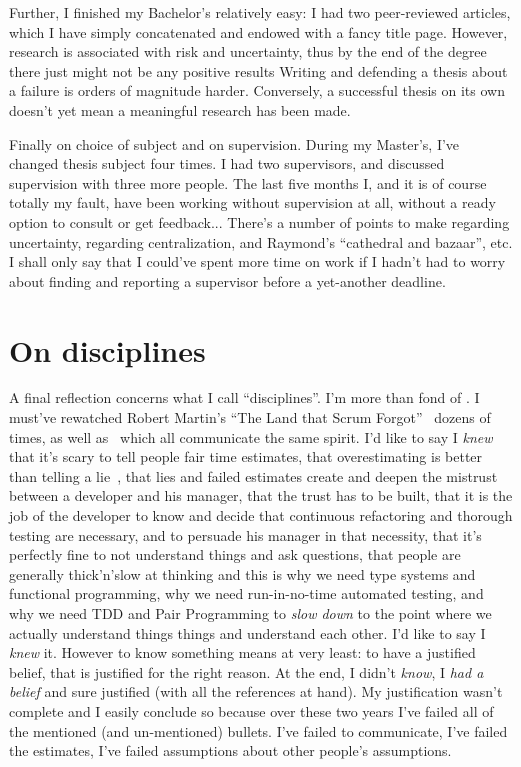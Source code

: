Further, I finished my Bachelor's relatively easy: I had two peer-reviewed
articles, which I have simply concatenated and endowed with a fancy title page.
However, research is associated with risk and uncertainty, thus by the end of
the degree there just might not be any positive results
Writing and defending a thesis about a failure is orders of magnitude harder.
Conversely, a successful thesis on its own doesn't yet mean a meaningful
research has been made.

Finally on choice of subject and on supervision. During my Master's, I've
changed thesis subject four times.  I had two supervisors, and discussed
supervision with three more people. The last five months I, and it is of course
totally my fault, have been working without supervision at all, without a ready
option to consult or get feedback... There's a number of points to make
regarding uncertainty, regarding centralization, and Raymond's ``cathedral and
bazaar'', etc. I shall only say that I could've spent more time on work if I
hadn't had to worry about finding and reporting a supervisor before a
yet-another deadline.

\section*{On disciplines}

A final reflection concerns what I call ``disciplines''.  I'm more than fond of
\citet{c2wiki}. I must've rewatched Robert Martin's ``The Land that Scrum
Forgot''~\cite{unclebobScrum} dozens of times, as well
as~\citet{unclebobProfessionalism,unclebobFuture,unclebobPrinciples,unclebobFunctional,unclebobCoplienTDD,unclebobTDD,unclebobHowNotToLie}
which all communicate the same spirit. I'd like to say I \emph{knew}
that it's scary to tell people fair time estimates,
that overestimating is better than telling a lie~\cite{unclebobHowNotToLie},
that lies and failed estimates create and deepen the mistrust between a
developer and his manager, that the trust has to be built, that it is the job
of the developer to know and decide that continuous refactoring and thorough
testing are necessary, and to persuade his manager in that necessity, that it's
perfectly fine to not understand things and ask questions, that people are generally
thick'n'slow at thinking and this is why we need type systems and functional programming,
why we need run-in-no-time automated testing, and why we need TDD and Pair Programming
to \emph{slow down} to the point where we actually understand things things
and understand each other. I'd like to say I \emph{knew} it. However to know something
means at very least: to have a justified belief, that is justified for the
right reason.  At the end, I didn't \emph{know}, I \emph{had a belief} and sure
justified (with all the references at hand). My justification wasn't complete
and I easily conclude so because over these two years I've failed all of the
mentioned (and un-mentioned) bullets. I've failed to communicate, I've failed
the estimates, I've failed assumptions about other people's assumptions.

